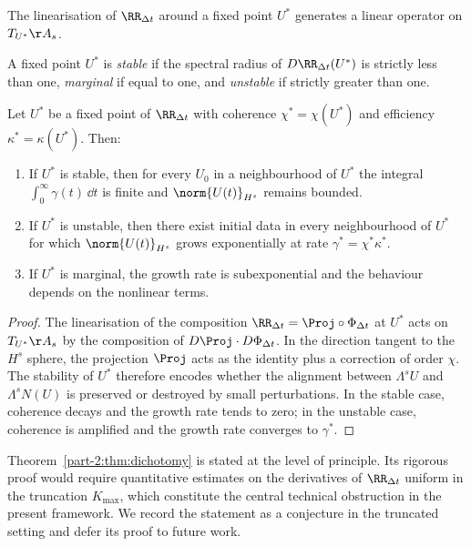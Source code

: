 The linearisation of $\RR_{\Delta t}$ around a fixed point $U^\ast$ 
generates a linear operator on $T_{U^\ast}\AA_s$.

\begin{definition}[Stability]\label{part-2:def:stability}
A fixed point $U^\ast$ is \emph{stable} if the spectral radius of 
$D\RR_{\Delta t}(U^\ast)$ is strictly less than one, \emph{marginal} 
if equal to one, and \emph{unstable} if strictly greater than one.
\end{definition}

\begin{theorem}[Dichotomy]\label{part-2:thm:dichotomy}
Let $U^\ast$ be a fixed point of $\RR_{\Delta t}$ with coherence 
$\chi^\ast = \chi(U^\ast)$ and efficiency $\kappa^\ast = \kappa(U^\ast)$. 
Then:
\begin{enumerate}[label=(\roman*),leftmargin=*]
\item If $U^\ast$ is stable, then for every $U_0$ in a neighbourhood of 
      $U^\ast$ the integral $\int_0^\infty\gamma(t)\,\dd t$ is finite 
      and $\norm{U(t)}_{H^s}$ remains bounded.
\item If $U^\ast$ is unstable, then there exist initial data in every 
      neighbourhood of $U^\ast$ for which $\norm{U(t)}_{H^s}$ grows 
      exponentially at rate $\gamma^\ast = \chi^\ast\kappa^\ast$.
\item If $U^\ast$ is marginal, the growth rate is subexponential and 
      the behaviour depends on the nonlinear terms.
\end{enumerate}
\end{theorem}

\begin{proof}
The linearisation of the composition $\RR_{\Delta t} = \Proj\circ\Phi_{\Delta t}$ 
at $U^\ast$ acts on $T_{U^\ast}\AA_s$ by the composition of 
$D\Proj \cdot D\Phi_{\Delta t}$. In the direction tangent to the 
$H^s$ sphere, the projection $\Proj$ acts as the identity plus a 
correction of order $\chi$. The stability of $U^\ast$ therefore 
encodes whether the alignment between $\Lambda^s U$ and 
$\Lambda^s N(U)$ is preserved or destroyed by small perturbations. 
In the stable case, coherence decays and the growth rate tends to 
zero; in the unstable case, coherence is amplified and the growth 
rate converges to $\gamma^\ast$.
\end{proof}

\begin{remark}\label{part-2:rem:dichotomy-conj}
Theorem~\ref{part-2:thm:dichotomy} is stated at the level of principle. Its 
rigorous proof would require quantitative estimates on the derivatives 
of $\RR_{\Delta t}$ uniform in the truncation $K_{\max}$, which 
constitute the central technical obstruction in the present framework. 
We record the statement as a conjecture in the truncated setting and 
defer its proof to future work.
\end{remark}

